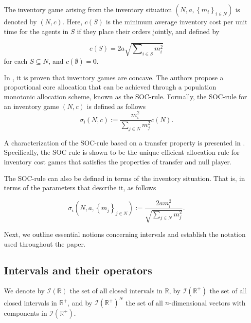 \documentclass[12pt]{article}
\begin{document}
\noindent The inventory game arising from the inventory situation $(N,a,\left\{
m_{i}\right\} _{i\in N})$ is denoted by $\left( N,c\right) $. Here, $c(S)$
is the minimum average inventory cost per unit time for the agents in $S$ if they
place their orders jointly, and defined by 

\begin{equation*}
c(S)=2a\sqrt{\sum\nolimits_{i\in
S}m_{i}^{2}}  
\end{equation*}
for each $S\subseteq N$, and $c(\emptyset)=0.$

In \cite{Meca2003}, it is proven that inventory games are concave. The authors propose a proportional core allocation that can be achieved through a population monotonic allocation scheme, known as the SOC-rule. Formally, the SOC-rule for an inventory game $\left( N,c\right)$ is defined as follows 
\begin{equation} \label{soc}
\sigma_i(N,c):=\frac{m_i^2}{
\sum_{j\in N}m_{j}^{2}}c(N).
\end{equation}

A characterization of the SOC-rule based on a transfer property is presented in \cite{Meca2004}. Specifically, the SOC-rule is shown to be the unique efficient allocation rule for inventory cost games that satisfies the properties of transfer and null player.

The SOC-rule can also be defined in terms of the inventory situation. That is, in terms of the parameters that describe it, as follows  

\begin{equation} \label{soc}
\sigma_i\left( N,a,\left\{m_{j}\right\} _{j\in N}\right):=\frac{2am_i^2}{\sqrt{\sum_{j\in N}m_{j}^{2}}}.
\end{equation}
 


\noindent Next, we outline essential notions concerning intervals and establish the notation used throughout the paper. 

\subsection{Intervals and their operators}
\noindent We denote by $\mathcal{I}(\mathbb{R})$ the set of all closed
intervals in $\mathbb{R}$, by $\mathcal{I}(\mathbb{R}^{+})$ the set of all
closed intervals in $\mathbb{R}^{+}$, and by $\mathcal{I}(\mathbb{R}%
^{+})^{N} $ the set of all $n$-dimensional vectors with components in $%
\mathcal{I}(\mathbb{R}^{+})$.
\end{document}
